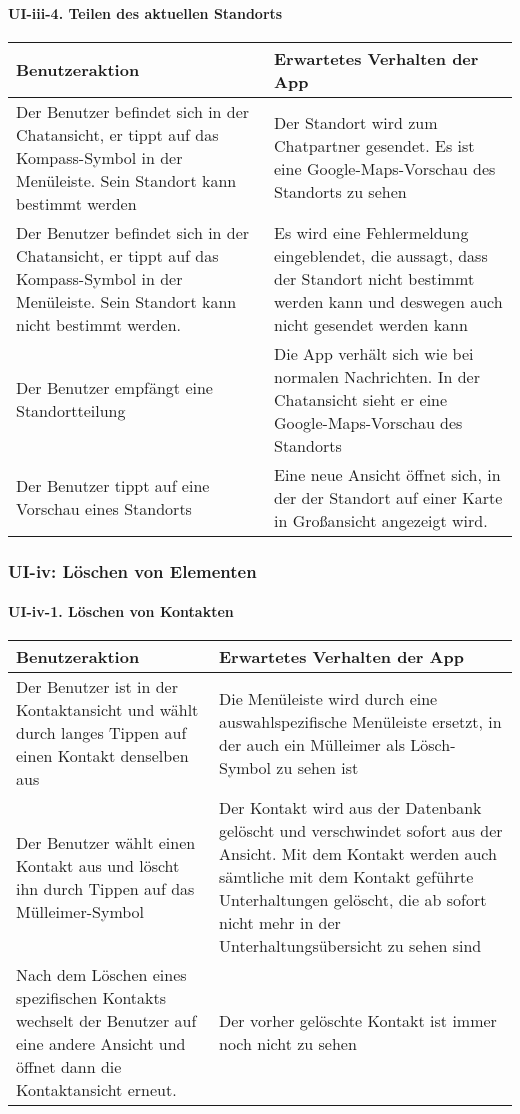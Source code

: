\paragraph{UI-iii-4. Teilen des aktuellen Standorts}\label{teilen-des-aktuellen-standorts}

\begin{longtable}{|p{8cm}|p{8.5cm}|}
\hline
Benutzeraktion & Erwartetes Verhalten der App\tabularnewline
\hline

Der Benutzer befindet sich in der Chatansicht, er tippt auf das
Kompass-Symbol in der Menüleiste. Sein Standort kann bestimmt werden &
Der Standort wird zum Chatpartner gesendet. Es ist eine
Google-Maps-Vorschau des Standorts zu sehen\tabularnewline
Der Benutzer befindet sich in der Chatansicht, er tippt auf das
Kompass-Symbol in der Menüleiste. Sein Standort kann nicht bestimmt
werden. & Es wird eine Fehlermeldung eingeblendet, die aussagt, dass der
Standort nicht bestimmt werden kann und deswegen auch nicht gesendet
werden kann\tabularnewline
Der Benutzer empfängt eine Standortteilung & Die App verhält sich wie
bei normalen Nachrichten. In der Chatansicht sieht er eine
Google-Maps-Vorschau des Standorts\tabularnewline
Der Benutzer tippt auf eine Vorschau eines Standorts & Eine neue Ansicht
öffnet sich, in der der Standort auf einer Karte in Großansicht
angezeigt wird.\tabularnewline
\hline
\end{longtable}




\clearpage
\subsubsection{UI-iv: Löschen von Elementen}\label{iv-luxf6schen-von-elementen}

\paragraph{UI-iv-1. Löschen von Kontakten}\label{luxf6schen-von-kontakten}

\begin{longtable}{|p{8cm}|p{8.5cm}|}
\hline
Benutzeraktion & Erwartetes Verhalten der App\tabularnewline
\hline

Der Benutzer ist in der Kontaktansicht und wählt durch langes Tippen auf
einen Kontakt denselben aus & Die Menüleiste wird durch eine
auswahlspezifische Menüleiste ersetzt, in der auch ein Mülleimer als
Lösch-Symbol zu sehen ist\tabularnewline
Der Benutzer wählt einen Kontakt aus und löscht ihn durch Tippen auf das
Mülleimer-Symbol & Der Kontakt wird aus der Datenbank gelöscht und
verschwindet sofort aus der Ansicht. Mit dem Kontakt werden auch
sämtliche mit dem Kontakt geführte Unterhaltungen gelöscht, die ab
sofort nicht mehr in der Unterhaltungsübersicht zu sehen
sind\tabularnewline
Nach dem Löschen eines spezifischen Kontakts wechselt der Benutzer auf
eine andere Ansicht und öffnet dann die Kontaktansicht erneut. & Der
vorher gelöschte Kontakt ist immer noch nicht zu sehen\tabularnewline
\hline
\end{longtable}

